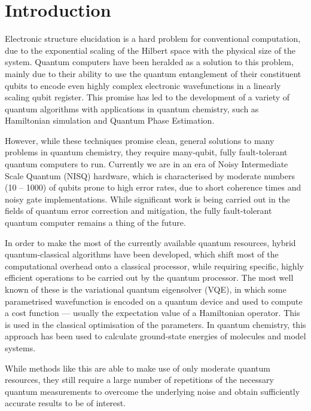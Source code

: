 \documentclass[%
 reprint,
 amsmath,amssymb,
 aps,
]{revtex4-2}
\begin{document}
\section{Introduction}
Electronic structure elucidation is a hard problem for conventional computation, due to the exponential scaling of the Hilbert space with the physical size of the system. Quantum computers have been heralded as a solution to this problem,\cite{Feynman1982, Aspuru-Guzik2005} mainly due to their ability to use the quantum entanglement of their constituent qubits to encode even highly complex electronic wavefunctions in a linearly scaling qubit register. This promise has led to the development of a variety of quantum algorithms with applications in quantum chemistry, such as Hamiltonian simulation\cite{Berry2007, Berry2015, Low2017, Childs2018} and Quantum Phase Estimation.\cite{Abrams1997, Abrams1999}

However, while these techniques promise clean, general solutions to many problems in quantum chemistry, they require many-qubit, fully fault-tolerant quantum computers to run. Currently we are in an era of Noisy Intermediate Scale Quantum (NISQ) hardware,\cite{Preskill2018} which is characterised by moderate numbers (10 -- 1000) of qubits prone to high error rates, due to short coherence times and noisy gate implementations.\cite{Linke2017} While significant work is being carried out in the fields of quantum error correction\cite{Georgescu2020} and mitigation, \cite{Cai2022} the fully fault-tolerant quantum computer remains a thing of the future.

In order to make the most of the currently available quantum resources, hybrid quantum-classical algorithms\cite{Farhi2014, Peruzzo2014, Colless2018, Higgott2019, Nakanishi2019, Greene-Diniz2021, Smart2021} have been developed, which shift most of the computational overhead onto a classical processor, while requiring specific, highly efficient operations to be carried out by the quantum processor. The most well known of these is the variational quantum eigensolver (VQE),\cite{Peruzzo2014} in which some parametrised wavefunction is encoded on a quantum device and used to compute a cost function --- usually the expectation value of a Hamiltonian operator. This is used in the classical optimisation of the parameters. In quantum chemistry, this approach has been used to calculate ground-state energies of molecules and model systems.\cite{Peruzzo2014, Shen2017, Hempel2018} 

While methods like this are able to make use of only moderate quantum resources, they still require a large number of repetitions of the necessary quantum measurements to overcome the underlying noise and obtain sufficiently accurate results to be of interest. 
\end{document}

